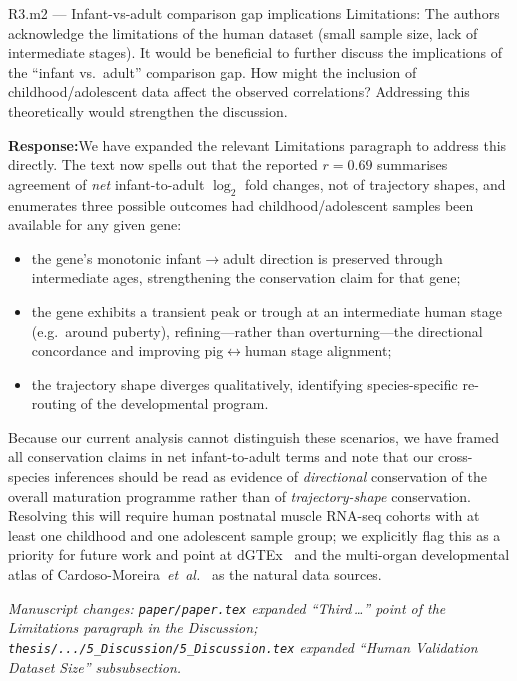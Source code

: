 \documentclass[11pt,a4paper]{article}
\newcommand{\response}[1]{%
  \par\vspace{2pt}\noindent\textbf{\textcolor{respcolor}{Response:}}\;\;#1\par\vspace{6pt}}
\newcommand{\changeloc}[1]{\par\noindent\textit{\small Manuscript changes: #1}\par}
\begin{document}
\begin{reviewerbox}{R3.m2 — Infant-vs-adult comparison gap implications}
Limitations: The authors acknowledge the limitations of the human dataset
(small sample size, lack of intermediate stages). It would be beneficial to
further discuss the implications of the ``infant vs.\ adult'' comparison gap.
How might the inclusion of childhood/adolescent data affect the observed
correlations? Addressing this theoretically would strengthen the discussion.
\end{reviewerbox}

\response{We have expanded the relevant Limitations paragraph to address
this directly. The text now spells out that the reported $r=0.69$
summarises agreement of \emph{net} infant-to-adult $\log_2$ fold
changes, not of trajectory shapes, and enumerates three possible
outcomes had childhood/adolescent samples been available for any given
gene:
\begin{itemize}[leftmargin=*, itemsep=2pt, topsep=2pt]
  \item the gene's monotonic infant$\rightarrow$adult direction is
        preserved through intermediate ages, strengthening the
        conservation claim for that gene;
  \item the gene exhibits a transient peak or trough at an intermediate
        human stage (e.g.\ around puberty), refining---rather than
        overturning---the directional concordance and improving
        pig$\leftrightarrow$human stage alignment;
  \item the trajectory shape diverges qualitatively, identifying
        species-specific re-routing of the developmental program.
\end{itemize}
Because our current analysis cannot distinguish these scenarios, we have
framed all conservation claims in net infant-to-adult terms and note
that our cross-species inferences should be read as evidence of
\emph{directional} conservation of the overall maturation programme
rather than of \emph{trajectory-shape} conservation. Resolving this
will require human postnatal muscle RNA-seq cohorts with at least one
childhood and one adolescent sample group; we explicitly flag this as a
priority for future work and point at dGTEx~\cite{coorens_human_2025}
and the multi-organ developmental atlas of
Cardoso-Moreira~\textit{et~al.}~\cite{cardoso-moreira_gene_2019} as the
natural data sources.}
\changeloc{\texttt{paper/paper.tex} expanded ``Third\,\ldots'' point of
the Limitations paragraph in the Discussion;
\texttt{thesis/.../5\_Discussion/5\_Discussion.tex} expanded
``Human Validation Dataset Size'' subsubsection.}
\end{document}
